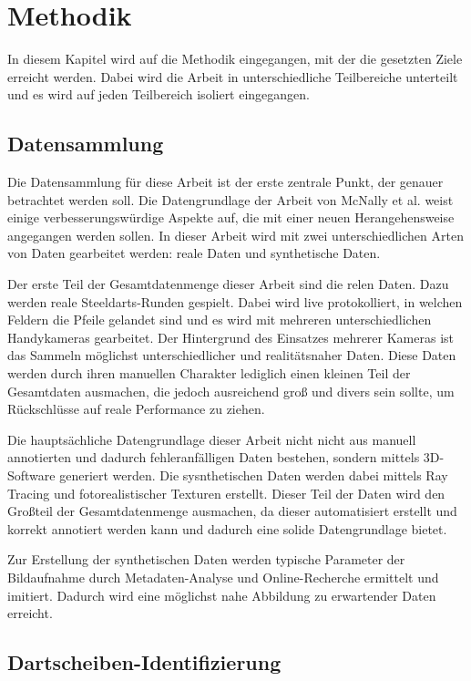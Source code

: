 \section{Methodik}
\label{sec:methodik}

In diesem Kapitel wird auf die Methodik eingegangen, mit der die gesetzten Ziele erreicht werden. Dabei wird die Arbeit in unterschiedliche Teilbereiche unterteilt und es wird auf jeden Teilbereich isoliert eingegangen.

\subsection{Datensammlung}
\label{sec:methodik:datensammlung}

Die Datensammlung für diese Arbeit ist der erste zentrale Punkt, der genauer betrachtet werden soll. Die Datengrundlage der Arbeit von McNally et al. weist einige verbesserungswürdige Aspekte auf, die mit einer neuen Herangehensweise angegangen werden sollen. In dieser Arbeit wird mit zwei unterschiedlichen Arten von Daten gearbeitet werden: reale Daten und synthetische Daten.

Der erste Teil der Gesamtdatenmenge dieser Arbeit sind die relen Daten. Dazu werden reale Steeldarts-Runden gespielt. Dabei wird live protokolliert, in welchen Feldern die Pfeile gelandet sind und es wird mit mehreren unterschiedlichen Handykameras gearbeitet. Der Hintergrund des Einsatzes mehrerer Kameras ist das Sammeln möglichst unterschiedlicher und realitätsnaher Daten. Diese Daten werden durch ihren manuellen Charakter lediglich einen kleinen Teil der Gesamtdaten ausmachen, die jedoch ausreichend groß und divers sein sollte, um Rückschlüsse auf reale Performance zu ziehen.

Die hauptsächliche Datengrundlage dieser Arbeit nicht nicht aus manuell annotierten und dadurch fehleranfälligen Daten bestehen, sondern mittels 3D-Software generiert werden. Die sysnthetischen Daten werden dabei mittels Ray Tracing und fotorealistischer Texturen erstellt. Dieser Teil der Daten wird den Großteil der Gesamtdatenmenge ausmachen, da dieser automatisiert erstellt und korrekt annotiert werden kann und dadurch eine solide Datengrundlage bietet.

Zur Erstellung der synthetischen Daten werden typische Parameter der Bildaufnahme durch Metadaten-Analyse und Online-Recherche ermittelt und imitiert. Dadurch wird eine möglichst nahe Abbildung zu erwartender Daten erreicht.

\subsection{Dartscheiben-Identifizierung}
\label{sec:methodik:dartscheibe}

